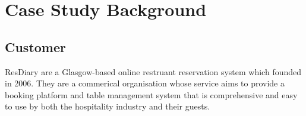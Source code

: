 \documentclass{l3proj}
\begin{document}
\newpage

\section{Case Study Background}
\label{sec:background}


\subsection{Customer}
\label{customer}



ResDiary are a Glasgow-based online restruant reservation system which founded in 2006. They are a commerical organisation whose service aims to provide a booking platform and table management system that is comprehensive and easy to use by both the hospitality industry and their guests.
\end{document}
